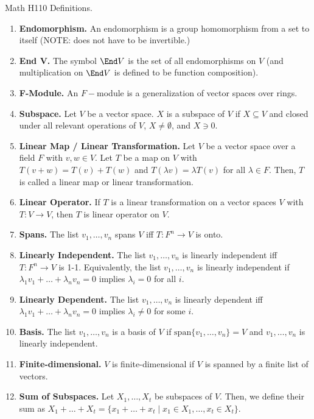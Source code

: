 

\begin{center}
    Math H110 Definitions. 
\end{center}

\begin{enumerate}
    \item \textbf{Endomorphism. } An endomorphism is a group homomorphism from a set to itself (NOTE: does not have to be invertible.)
    \item \textbf{End V. } The symbol $\End V$ is the set of all endomorphisms on $V$ (and multiplication on $\End V$ is defined to be function composition). 
    \item \textbf{F-Module. } An $F-$module is a generalization of vector spaces over rings. 
    \item \textbf{Subspace. } Let $V$ be a vector space. $X$ is a subspace of $V$ if $X \subseteq V$ and closed under all relevant operations of $V$, $X \neq \emptyset$, and $X \ni 0$. 
    \item \textbf{Linear Map / Linear Transformation. } Let $V$ be a vector space over a field $F$ with $v,w \in V$. Let $T$ be a map on $V$ with $T(v+w) = T(v) + T(w)$ and $T(\lambda v) = \lambda T(v)$ for all $\lambda \in F$. Then, $T$ is called a linear map or linear transformation. 
    \item \textbf{Linear Operator. } If $T$ is a linear transformation on a vector spaces $V$ with $T: V \to V$, then $T$ is linear operator on $V$. 
    \item \textbf{Spans. } The list $v_1,\dots,v_n$ spans $V$ iff $T: F^n \to V$ is onto. 
    \item \textbf{Linearly Independent. } The list $v_1,\dots,v_n$ is linearly independent iff $T: F^n \to V$ is 1-1. Equivalently, the list $v_1,\dots,v_n$ is linearly independent if $\lambda_1v_1 + \dots + \lambda_nv_n = 0$ implies $\lambda_i=0$ for all $i$. 
    \item \textbf{Linearly Dependent. } The list $v_1,\dots,v_n$ is linearly dependent iff $\lambda_1v_1 + \dots + \lambda_nv_n = 0$ implies $\lambda_i \neq 0$ for some $i$. 
    \item \textbf{Basis. } The list $v_1,\dots,v_n$ is a basis of $V$ if $\textrm{span}\{v_1,\dots,v_n\} = V$ and $v_1,\dots,v_n$ is linearly independent. 
    \item \textbf{Finite-dimensional. } $V$ is finite-dimensional if $V$ is spanned by a finite list of vectors. 
    \item \textbf{Sum of Subspaces. } Let $X_1,\dots,X_t$ be subspaces of $V$. Then, we define their sum as $X_1 + \dots + X_t = \{x_1 + \dots + x_t \mid x_1 \in X_1, \dots, x_t \in X_t\}$. 

\end{enumerate}
